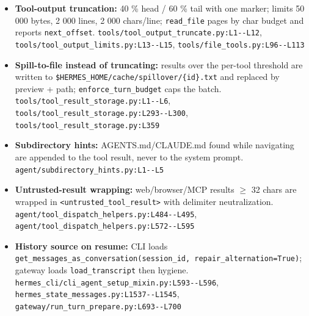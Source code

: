 \begin{itemize}
\item \textbf{Tool-output truncation:} 40 \% head / 60 \% tail with one marker; limits 50 000 bytes, 2 000 lines, 2 000 chars/line; \texttt{read\_\allowbreak{}file} pages by char budget and reports \texttt{next\_\allowbreak{}offset}. \texttt{tools/\allowbreak{}tool\_\allowbreak{}output\_\allowbreak{}truncate.\allowbreak{}py:\allowbreak{}L1-\allowbreak{}-\allowbreak{}L12}, \texttt{tools/\allowbreak{}tool\_\allowbreak{}output\_\allowbreak{}limits.\allowbreak{}py:\allowbreak{}L13-\allowbreak{}-\allowbreak{}L15}, \texttt{tools/\allowbreak{}file\_\allowbreak{}tools.\allowbreak{}py:\allowbreak{}L96-\allowbreak{}-\allowbreak{}L113}
\item \textbf{Spill-to-file instead of truncating:} results over the per-tool threshold are written to \texttt{\$HERMES\_\allowbreak{}HOME/\allowbreak{}cache/\allowbreak{}spillover/\allowbreak{}\{id\}.\allowbreak{}txt} and replaced by preview + path; \texttt{enforce\_\allowbreak{}turn\_\allowbreak{}budget} caps the batch. \texttt{tools/\allowbreak{}tool\_\allowbreak{}result\_\allowbreak{}storage.\allowbreak{}py:\allowbreak{}L1-\allowbreak{}-\allowbreak{}L6}, \texttt{tools/\allowbreak{}tool\_\allowbreak{}result\_\allowbreak{}storage.\allowbreak{}py:\allowbreak{}L293-\allowbreak{}-\allowbreak{}L300}, \texttt{tools/\allowbreak{}tool\_\allowbreak{}result\_\allowbreak{}storage.\allowbreak{}py:\allowbreak{}L359}
\item \textbf{Subdirectory hints:} AGENTS.md/CLAUDE.md found while navigating are appended to the tool result, never to the system prompt. \texttt{agent/\allowbreak{}subdirectory\_\allowbreak{}hints.\allowbreak{}py:\allowbreak{}L1-\allowbreak{}-\allowbreak{}L5}
\item \textbf{Untrusted-result wrapping:} web/browser/MCP results $\geq$ 32 chars are wrapped in \texttt{<untrusted\_\allowbreak{}tool\_\allowbreak{}result>} with delimiter neutralization. \texttt{agent/\allowbreak{}tool\_\allowbreak{}dispatch\_\allowbreak{}helpers.\allowbreak{}py:\allowbreak{}L484-\allowbreak{}-\allowbreak{}L495}, \texttt{agent/\allowbreak{}tool\_\allowbreak{}dispatch\_\allowbreak{}helpers.\allowbreak{}py:\allowbreak{}L572-\allowbreak{}-\allowbreak{}L595}
\item \textbf{History source on resume:} CLI loads \texttt{get\_\allowbreak{}messages\_\allowbreak{}as\_\allowbreak{}conversation(\allowbreak{}session\_\allowbreak{}id, repair\_\allowbreak{}alternation=True)}; gateway loads \texttt{load\_\allowbreak{}transcript} then hygiene. \texttt{hermes\_\allowbreak{}cli/\allowbreak{}cli\_\allowbreak{}agent\_\allowbreak{}setup\_\allowbreak{}mixin.\allowbreak{}py:\allowbreak{}L593-\allowbreak{}-\allowbreak{}L596}, \texttt{hermes\_\allowbreak{}state\_\allowbreak{}messages.\allowbreak{}py:\allowbreak{}L1537-\allowbreak{}-\allowbreak{}L1545}, \texttt{gateway/\allowbreak{}run\_\allowbreak{}turn\_\allowbreak{}prepare.\allowbreak{}py:\allowbreak{}L693-\allowbreak{}-\allowbreak{}L700}

\end{itemize}
